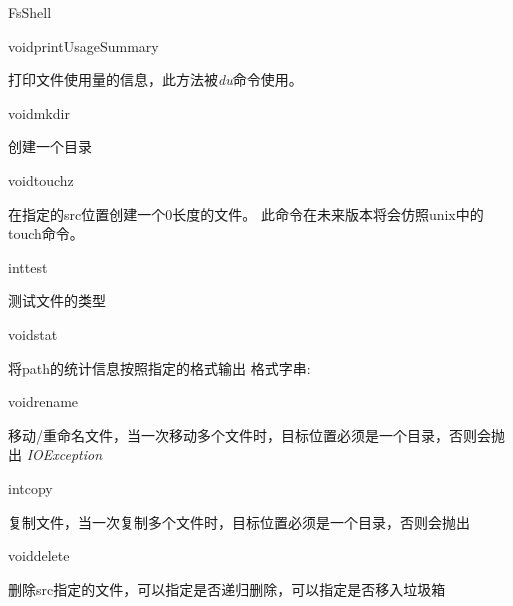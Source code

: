 \begin{XeClass}{FsShell}
    \begin{XeMethod}{\XePrivate}{void}{printUsageSummary}
         
 打印文件使用量的信息，此方法被\emph{du}命令使用。

    \end{XeMethod}

    \begin{XeMethod}{}{void}{mkdir}
         
 创建一个目录

    \end{XeMethod}

    \begin{XeMethod}{}{void}{touchz}
         
 在指定的src位置创建一个0长度的文件。
 此命令在未来版本将会仿照unix中的touch命令。

    \end{XeMethod}

    \begin{XeMethod}{}{int}{test}
         
 测试文件的类型

    \end{XeMethod}

    \begin{XeMethod}{}{void}{stat}
         
 将path的统计信息按照指定的格式输出
 格式字串:

    \end{XeMethod}

    \begin{XeMethod}{}{void}{rename}
         
 移动/重命名文件，当一次移动多个文件时，目标位置必须是一个目录，否则会抛出
 \emph{IOException}

    \end{XeMethod}

    \begin{XeMethod}{\XePrivate}{int}{copy}
         
 复制文件，当一次复制多个文件时，目标位置必须是一个目录，否则会抛出

    \end{XeMethod}

    \begin{XeMethod}{\XePrivate}{void}{delete}
         
 删除src指定的文件，可以指定是否递归删除，可以指定是否移入垃圾箱


\end{XeMethod}
\end{XeClass}

